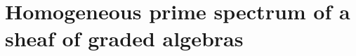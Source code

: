 \section{Homogeneous prime spectrum of a sheaf of graded algebras}
\label{section:homogeneous-prime-spectrum-sheaf-of-graded-algebras}

